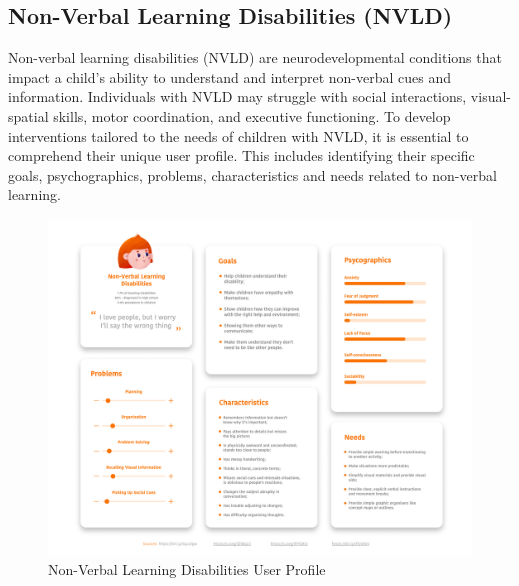 \subsection{Non-Verbal Learning Disabilities (NVLD)}
Non-verbal learning disabilities (NVLD) are neurodevelopmental conditions that impact a child's ability to understand and interpret non-verbal cues and information. Individuals with NVLD may struggle with social interactions, visual-spatial skills, motor coordination, and executive functioning. To develop interventions tailored to the needs of children with NVLD, it is essential to comprehend their unique user profile. This includes identifying their specific goals, psychographics, problems, characteristics and needs related to non-verbal learning.

\begin{figure}[H]
    \centering
    \includegraphics[width=0.8\linewidth]{Chapters/figma/Non-Verbal Learning Disabilities.png}
    \caption{Non-Verbal Learning Disabilities User Profile}
    \label{fig:nvldUserProfile}
\end{figure}

